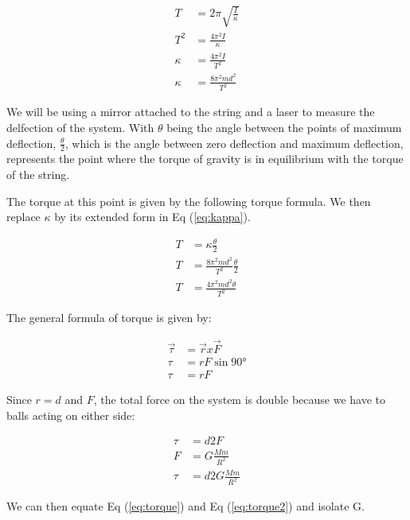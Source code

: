 \documentclass{report}
\begin{document}
\begin{equation}
    \begin{aligned}
        T&=2\pi\sqrt{\frac{I}{\kappa}}\\ 
        T^2&=\frac{4\pi^2I}{\kappa}\\ 
        \kappa&=\frac{4\pi^2I}{T^2}\\ 
        \kappa&=\frac{8\pi^2md^2}{T^2} \label{eq:kappa} 
    \end{aligned}
\end{equation}

We will be using a mirror attached to the string and a laser to measure the delfection of the system. With $\theta$ being the angle between the points of maximum deflection, $\frac{\theta}{2}$, which is the angle between zero deflection and maximum deflection, represents the point where the torque of gravity is in equilibrium with the torque of the string. 

\newpage
The torque at this point is given by the following torque formula. We then replace $\kappa$ by its extended form in Eq (\ref{eq:kappa}).

\begin{align}
    T&=\kappa\frac{\theta}{2}\nonumber\\ 
    T&=\frac{8\pi^2md^2}{T^2}  \frac{\theta}{2} \nonumber\\
    T&=\frac{4\pi^2md^2\theta}{T^2} \label{eq:torque}
\end{align}

The general formula of torque is given by:

\begin{equation}
    \begin{aligned}
        \vec{\tau}&= \vec{r} x \vec{F}\\
        \tau&=rF \sin{\ang{90}}\\
        \tau&=rF
    \end{aligned}
\end{equation}

Since $r = d$ and $F$, the total force on the system is double because we have to balls acting on either side:


\begin{align}
    \tau&=d2F\nonumber\\ 
    F&=G\frac{Mm}{R^2}\nonumber\\
    \tau&=d2G\frac{Mm}{R^2} \label {eq:torque2}
\end{align}

We can then equate Eq (\ref{eq:torque}) and Eq (\ref{eq:torque2}) and isolate G.
\end{document}

